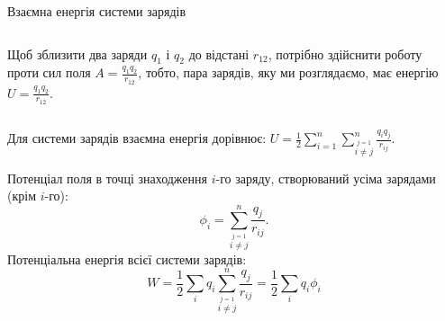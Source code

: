 \documentclass[onlytextwidth]{beamer}
\begin{document}
\begin{frame}{Взаємна енергія системи зарядів}
	\begin{columns}
		\begin{column}{0.8\linewidth}
			\begin{block}{}\justifying
				Щоб зблизити два заряди $q_1$ і $q_2$ до відстані $r_{12}$, потрібно здійснити
				роботу проти сил поля $A = \frac{q_1q_2}{r_{12}}$, тобто, пара зарядів, яку ми
				розглядаємо, має енергію $ U = \frac{q_1q_2}{r_{12}} $.
			\end{block}
		\end{column}
		\begin{column}{0.2\linewidth}\centering

		\end{column}
	\end{columns}
	\begin{block}{}
		Для системи зарядів взаємна енергія дорівнює:
		$
			U = \frac12\sum\limits_{i = 1}^n\sum\limits_{\stackrel{j = 1}{i \neq j}}^n
			\frac{q_iq_j}{r_{ij}}
		$.
	\end{block}
	\begin{block}{}\justifying
		Потенціал поля в точці знаходження $i$-го заряду, створюваний усіма зарядами (крім $i$-го):
		\begin{equation*}
			\phi_i = \sum\limits_{\stackrel{j = 1}{i \neq j}}^n \frac{q_j}{r_{ij}}.
		\end{equation*}
		Потенціальна енергія всієї системи зарядів:
		\begin{equation*}
			W = \frac12\sum_iq_i\sum\limits_{\stackrel{j = 1}{i \neq j}}^n \frac{q_j}{r_{ij}} =
			\frac12
			\sum_i q_i\phi_i
		\end{equation*}
	\end{block}
\end{frame}
\end{document}
